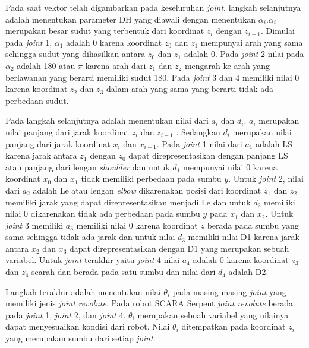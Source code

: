 Pada saat vektor telah digambarkan pada keseluruhan \textit{joint}, langkah selanjutnya adalah menentukan parameter DH yang diawali dengan menentukan $\alpha_{i}. \alpha_{i}$ merupakan besar sudut yang terbentuk dari koordinat $z_{i}$ dengan $z_{i-1}$.  Dimulai pada \textit{joint} 1, $\alpha_{1}$ adalah 0 karena koordinat $z_{0}$ dan $z_{1}$ mempunyai arah yang sama sehingga sudut yang dihasilkan antara $z_{0}$ dan $z_{1}$ adalah 0.  Pada \textit{joint} 2 nilai pada $\alpha_{2}$ adalah 180 atau  $\pi$ karena arah dari  $z_{1}$ dan  $z_{2}$ mengarah ke arah yang berlawanan yang berarti memiliki sudut 180. Pada \textit{joint} 3 dan 4 memiliki nilai 0 karena koordinat $z_{2}$ dan $z_{3}$ dalam arah yang sama yang berarti tidak ada perbedaan sudut.

Pada langkah selanjutnya adalah menentukan nilai dari $a_{i}$ dan $d_{i}$. $a_{i}$ merupakan nilai panjang dari jarak koordinat  $z_{i}$  dan  $z_{i-1}$ . Sedangkan $d_{i}$ merupakan nilai panjang dari jarak koordinat $x_{i}$ dan $x_{i-1}$. Pada \textit{joint} 1 nilai dari $a_{1}$ adalah LS karena jarak antara $z_{1}$ dengan $z_{0}$ dapat direpresentasikan dengan panjang LS atau panjang dari lengan \textit{shoulder} dan untuk $d_{1}$ mempunyai nilai 0 karena koordinat $x_{0}$ dan $x_{1}$ tidak memiliki perbedaan pada sumbu $y$. Untuk \textit{joint} 2, nilai dari $a_{2}$ adalah Le atau lengan \textit{elbow} dikarenakan posisi dari koordinat $z_{1}$  dan $z_{2}$  memiliki jarak yang dapat direpresentasikan menjadi Le dan untuk  $d_{2}$ memiliki nilai 0 dikarenakan tidak ada perbedaan pada sumbu $y$ pada  $x_{1}$ dan  $x_{2}$.  Untuk \textit{joint} 3 memiliki $a_{3}$ memiliki nilai 0 karena koordinat $z$ berada pada sumbu yang sama sehingga tidak ada jarak dan untuk nilai $d_{3}$  memiliki nilai D1 karena jarak antara $x_{2}$ dan $x_{3}$ dapat direpresentasikan dengan D1 yang merupakan sebuah variabel. Untuk \textit{joint} terakhir yaitu \textit{joint} 4 nilai $a_{4}$ adalah 0 karena koordinat $z_{3}$ dan $z_{4}$ searah dan berada pada satu sumbu dan nilai dari $d_{4}$ adalah D2.

Langkah terakhir adalah menentukan nilai $\theta_{i}$ pada masing-masing \textit{joint} yang memiliki jenis \textit{joint}  \textit{revolute}. Pada robot SCARA Serpent \textit{joint revolute} berada pada \textit{joint} 1, \textit{joint} 2, dan \textit{joint} 4.  $\theta_{i}$ merupakan sebuah variabel yang nilainya dapat menyesuaikan kondisi dari robot. Nilai  $\theta_{i}$ ditempatkan pada koordinat $z_{i}$ yang merupakan sumbu dari setiap \textit{joint}. 


